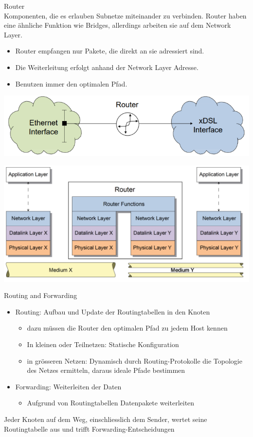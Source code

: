\begin{definition}{Router}\\
     Komponenten, die es erlauben Subnetze miteinander zu verbinden. Router haben eine ähnliche Funktion wie Bridges, allerdings arbeiten sie auf dem Network Layer.
    \begin{itemize}
        \item Router empfangen nur Pakete, die direkt an sie adressiert sind.
        \item Die Weiterleitung erfolgt anhand der Network Layer Adresse.
        \item Benutzen immer den optimalen Pfad.
    \end{itemize}
        \includegraphics[width=0.7\linewidth]{images/router.png}
\end{definition}
    \includegraphics[width=1\linewidth]{images/router2.png}

\begin{concept}{Routing and Forwarding}
    \begin{itemize}
        \item Routing: Aufbau und Update der Routingtabellen in den Knoten
            \begin{itemize}
                \item dazu müssen die Router den optimalen Pfad zu jedem Host kennen
                \item In kleinen oder Teilnetzen: Statische Konfiguration
                \item in grösseren Netzen: Dynamisch durch Routing-Protokolle die Topologie des Netzes ermitteln, daraus ideale Pfade bestimmen
            \end{itemize}
        \item Forwarding: Weiterleiten der Daten
        \begin{itemize}
            \item Aufgrund von Routingtabellen Datenpakete weiterleiten
        \end{itemize}
    \end{itemize}
    Jeder Knoten auf dem Weg, einschliesslich dem Sender, wertet seine Routingtabelle aus und trifft Forwarding-Entscheidungen
\end{concept}

